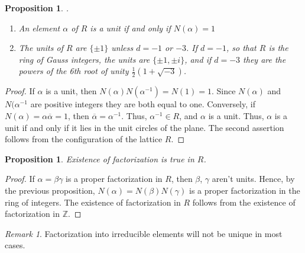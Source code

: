 \documentclass[12pt]{article}
\newtheorem{prop}[thm]{Proposition}
\theoremstyle{definition}
\theoremstyle{remark}
\newtheorem{rmk}[thm]{Remark}
\numberwithin{equation}{section}
\newcommand\Z{\mathbb Z}    %
\begin{document}
\begin{prop}
        .\newline \begin{enumerate}
                \item An element $\alpha$ of $R$ is a unit if and only if $N(\alpha) = 1$
                \item The units of $R$ are $\{\pm 1\}$ unless $d = -1$ or $-3$. If $d = -1$, so that $R$ is the ring of Gauss integers, the units are $\{\pm 1,\pm i\}$, and if $d = -3$ they are the powers of the 6th root of unity $\frac{1}{2}(1+\sqrt{-3})$.
        \end{enumerate}
\end{prop}
\begin{proof}
        If $\alpha$ is a unit, then $N(\alpha)N(\alpha^{-1}) = N(1) = 1$. Since $N(\alpha)$ and $N(\alpha^{-1}$ are positive integers they are both equal to one. Conversely, if $N(\alpha) = \alpha\overline{\alpha} = 1$, then $\overline{\alpha} = \alpha^{-1}$. Thus, $\alpha^{-1} \in R$, and $\alpha$ is a unit. Thus, $\alpha$ is a unit if and only if it lies in the unit circles of the plane. The second assertion follows from the configuration of the lattice $R$.
\end{proof}

\vspace{15pt}

\begin{prop}
        Existence of factorization is true in $R$.
\end{prop}
\begin{proof}
        If $\alpha = \beta\gamma$ is a proper factorization in $R$, then $\beta$, $\gamma$ aren't units. Hence, by the previous proposition, $N(\alpha) = N(\beta)N(\gamma)$ is a proper factorization in the ring of integers. The existence of factorization in $R$ follows from the existence of factorization in $\Z$.
\end{proof}


\vspace{15pt}


\begin{rmk}
        Factorization into irreducible elements will not be unique in most cases.
\end{rmk}

\vspace{15pt}
\end{document}
